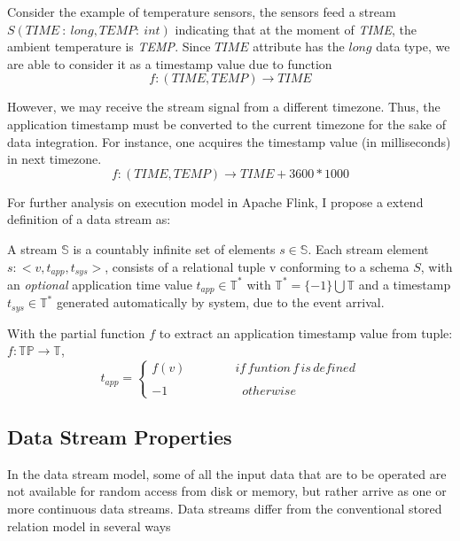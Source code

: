 Consider the example of temperature sensors, the sensors feed a stream $S(TIME\ :\ long,TEMP:\ int)$ indicating that at the moment of \textit{TIME}, the ambient temperature is \textit{TEMP}. Since $TIME$ attribute has the $long$ data type, we are able to consider it as a timestamp value due to function
\begin{equation}
f: (TIME, TEMP) \rightarrow TIME
\end{equation}

However, we may receive the stream signal from a different timezone. Thus, the application timestamp must be converted to the current timezone for the sake of data integration. For instance, one acquires the timestamp value (in milliseconds) in next timezone.
\begin{equation}
f: (TIME, TEMP) \rightarrow TIME + 3600*1000
\end{equation}



For further analysis on execution model in Apache Flink, I propose a extend definition of a data stream as:
\begin{defi}
	A stream $\mathbb{S}$ is a countably infinite set of elements $s \in \mathbb{S}$. Each  stream element $s: <v, t_{app}, t_{sys}>$, consists of a relational tuple v conforming to a schema $S$, with an \textit{optional} application time value $t_{app} \in \mathbb{T}^*$ with $\mathbb{T}^* = \{-1\} \bigcup \mathbb{T}$ and a timestamp $t_{sys} \in \mathbb{T}^*$ generated automatically by system, due to the event arrival.
\end{defi}

With the partial function $f$ to extract an application timestamp value from tuple: $f: \mathbb{TP} \rightarrow \mathbb{T}$,
\begin{equation}
	t_{app} = 
	\begin{cases}
		f(v) \qquad\qquad if\,funtion\, f\, is\, defined\\
		   \\
		-1 \qquad\qquad\qquad otherwise
	\end{cases}
\end{equation}



 
\subsection*{Data Stream Properties} 
In the data stream model, some of all the input data that are to be operated are not available for random access from disk or memory, but rather arrive as one or more continuous data streams. Data streams differ from the conventional stored relation model in several ways\citep{Babcock:2002}

